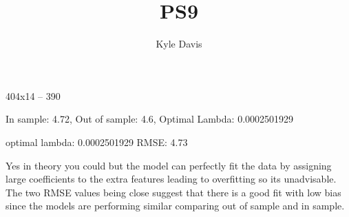 \documentclass{assignmeownt}
\title{PS9}
\author{Kyle Davis}
\date{}
\begin{document}
\maketitle
\thispagestyle{firststyle}

\question
\par 404x14 -- 390

\question
\par In sample: 4.72, Out of sample: 4.6, Optimal Lambda:  0.0002501929


\question
\par optimal lambda: 0.0002501929 RMSE: 4.73

\question
\par Yes in theory you could but the model can perfectly fit the data by assigning large coefficients to the extra features leading to overfitting so its unadvisable. The two RMSE values being close suggest that there is a good fit with low bias since the models are performing similar comparing out of sample and in sample. 
\end{document}
